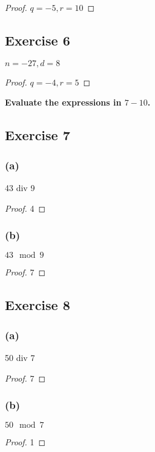 \documentclass[14pt]{extarticle}
\newcommand{\cy}{\color{cyan}}
\begin{document}
\begin{proof}
    $q = -5, r = 10$
\end{proof}

\subsection{Exercise 6}
$n = -27, d = 8$

\begin{proof}
    $q = -4, r = 5$
\end{proof}

{\bf \cy Evaluate the expressions in $7-10$.}

\subsection{Exercise 7}

\subsubsection{(a)}
43 div 9

\begin{proof}
    4
\end{proof}

\subsubsection{(b)}
$43 \mod 9$

\begin{proof}
    7
\end{proof}

\subsection{Exercise 8}

\subsubsection{(a)}
50 div 7

\begin{proof}
    7
\end{proof}

\subsubsection{(b)}
$50 \mod 7$

\begin{proof}
    1
\end{proof}
\end{document}
